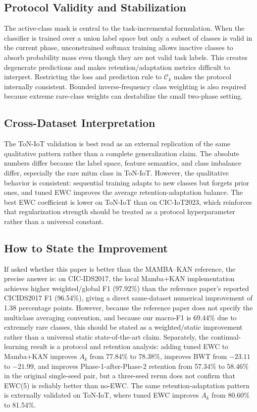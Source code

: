 \documentclass[a4paper,fleqn]{cas-dc}
\begin{document}
\subsection{Protocol Validity and Stabilization}
The active-class mask is central to the task-incremental formulation. When the classifier is trained over a union label space but only a subset of classes is valid in the current phase, unconstrained softmax training allows inactive classes to absorb probability mass even though they are not valid task labels. This creates degenerate predictions and makes retention/adaptation metrics difficult to interpret. Restricting the loss and prediction rule to $\mathcal{C}_k$ makes the protocol internally consistent. Bounded inverse-frequency class weighting is also required because extreme rare-class weights can destabilize the small two-phase setting.

\subsection{Cross-Dataset Interpretation}
The ToN-IoT validation is best read as an external replication of the same qualitative pattern rather than a complete generalization claim. The absolute numbers differ because the label space, feature semantics, and class imbalance differ, especially the rare mitm class in ToN-IoT. However, the qualitative behavior is consistent: sequential training adapts to new classes but forgets prior ones, and tuned EWC improves the average retention-adaptation balance. The best EWC coefficient is lower on ToN-IoT than on CIC-IoT2023, which reinforces that regularization strength should be treated as a protocol hyperparameter rather than a universal constant.

\subsection{How to State the Improvement}
If asked whether this paper is better than the MAMBA--KAN reference, the precise answer is: on CIC-IDS2017, the local Mamba+KAN implementation achieves higher weighted/global F1 (97.92\%) than the reference paper's reported CICIDS2017 F1 (96.54\%), giving a direct same-dataset numerical improvement of 1.38 percentage points. However, because the reference paper does not specify the multiclass averaging convention, and because our macro-F1 is 69.44\% due to extremely rare classes, this should be stated as a weighted/static improvement rather than a universal static state-of-the-art claim. Separately, the continual-learning result is a protocol and retention analysis: adding tuned EWC to Mamba+KAN improves $A_k$ from 77.84\% to 78.38\%, improves BWT from $-23.11$ to $-21.99$, and improves Phase-1-after-Phase-2 retention from 57.34\% to 58.46\% in the original single-seed pair, but a three-seed rerun does not confirm that EWC(5) is reliably better than no-EWC. The same retention-adaptation pattern is externally validated on ToN-IoT, where tuned EWC improves $A_k$ from 80.60\% to 81.54\%.
\end{document}
